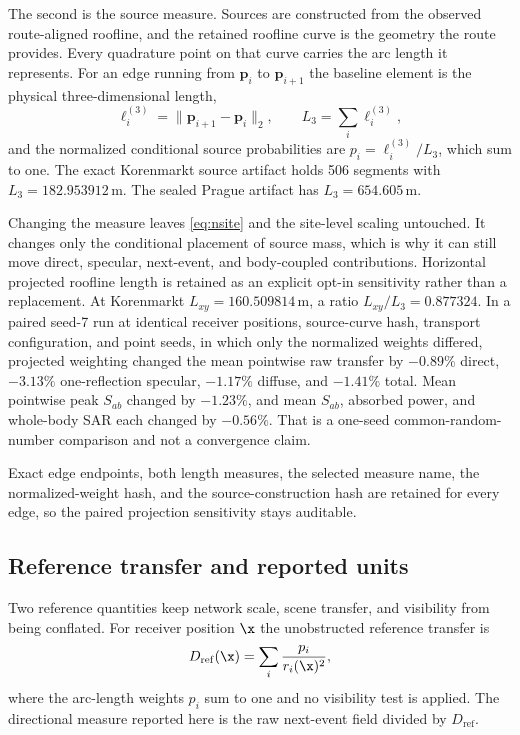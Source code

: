 The second is the source measure. Sources are constructed from the observed
route-aligned roofline, and the retained roofline curve is the geometry the
route provides. Every quadrature point on that curve carries the arc length it
represents. For an edge running from $\mathbf{p}_i$ to $\mathbf{p}_{i+1}$ the
baseline element is the physical three-dimensional length,
\begin{equation}
  \ell_i^{(3)} = \lVert \mathbf{p}_{i+1} - \mathbf{p}_i \rVert_2 ,
  \qquad
  L_3 = \sum_i \ell_i^{(3)} ,
  \label{eq:arclength}
\end{equation}
and the normalized conditional source probabilities are
$p_i = \ell_i^{(3)} / L_3$, which sum to one. The exact Korenmarkt source
artifact holds 506 segments with $L_3 = 182.953912$\,m. The sealed Prague
artifact has $L_3 = 654.605$\,m.

Changing the measure leaves \eqref{eq:nsite} and the site-level scaling
untouched. It changes only the conditional placement of source mass, which is
why it can still move direct, specular, next-event, and body-coupled
contributions. Horizontal projected roofline length is retained as an explicit
opt-in sensitivity rather than a replacement. At Korenmarkt
$L_{xy} = 160.509814$\,m, a ratio $L_{xy}/L_3 = 0.877324$. In a paired seed-7
run at identical receiver positions, source-curve hash, transport
configuration, and point seeds, in which only the normalized weights differed,
projected weighting changed the mean pointwise raw transfer by $-0.89\%$
direct, $-3.13\%$ one-reflection specular, $-1.17\%$ diffuse, and $-1.41\%$
total. Mean pointwise peak $S_{ab}$ changed by $-1.23\%$, and mean $S_{ab}$,
absorbed power, and whole-body SAR each changed by $-0.56\%$. That is a
one-seed common-random-number comparison and not a convergence claim.

Exact edge endpoints, both length measures, the selected measure name, the
normalized-weight hash, and the source-construction hash are retained for every
edge, so the paired projection sensitivity stays auditable.

\subsection{Reference transfer and reported units}
\label{sec:normalization}

Two reference quantities keep network scale, scene transfer, and visibility
from being conflated. For receiver position $\x$ the unobstructed reference
transfer is
\begin{equation}
  D_{\mathrm{ref}}(\x) = \sum_i \frac{p_i}{r_i(\x)^2} ,
  \label{eq:dref}
\end{equation}
where the arc-length weights $p_i$ sum to one and no visibility test is
applied. The directional measure reported here is the raw next-event field
divided by $D_{\mathrm{ref}}$.

